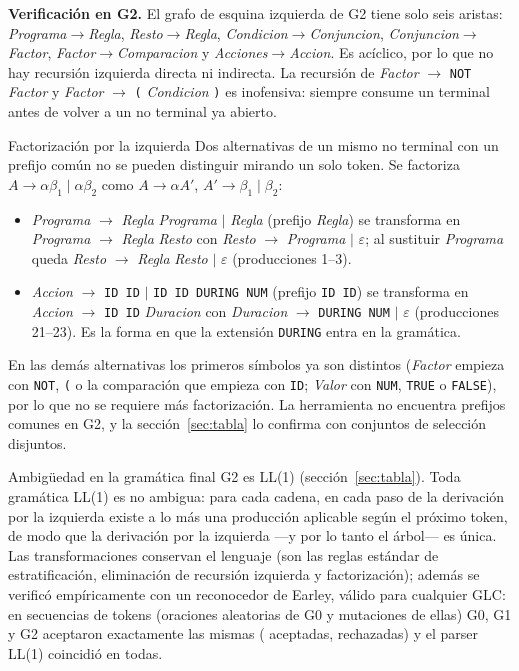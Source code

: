 \documentclass[11pt,letterpaper]{article}
\makeatletter
\renewcommand\subsection{\@startsection{subsection}{2}{\z@}{-2.6ex\@plus -1ex \@minus -.2ex}{1.0ex \@plus .2ex}%
  {\normalfont\large\bfseries}}
\newcommand{\T}[1]{\texttt{#1}}
\newcommand{\NT}[1]{\textit{#1}}
\newcommand{\eps}{\ensuremath{\varepsilon}}
\makeatother
\begin{document}
\textbf{Verificación en G2.} El grafo de esquina izquierda de G2 tiene solo seis aristas:
\NT{Programa}$\to$\NT{Regla}, \NT{Resto}$\to$\NT{Regla}, \NT{Condicion}$\to$\NT{Conjuncion},
\NT{Conjuncion}$\to$\NT{Factor}, \NT{Factor}$\to$\NT{Comparacion} y \NT{Acciones}$\to$\NT{Accion}. Es
acíclico, por lo que no hay recursión izquierda directa ni indirecta. La recursión de \NT{Factor} $\to$ \T{NOT}
\NT{Factor} y \NT{Factor} $\to$ \T{(} \NT{Condicion} \T{)} es inofensiva: siempre consume un terminal antes de
volver a un no terminal ya abierto.

\subsection{Factorización por la izquierda}
Dos alternativas de un mismo no terminal con un prefijo común no se pueden distinguir mirando un solo token.
Se factoriza $A \to \alpha\beta_1 \mid \alpha\beta_2$ como $A \to \alpha A'$, $A' \to \beta_1 \mid \beta_2$:
\begin{itemize}
\item \NT{Programa} $\to$ \NT{Regla} \NT{Programa} $\mid$ \NT{Regla} (prefijo \NT{Regla}) se transforma en
\NT{Programa} $\to$ \NT{Regla} \NT{Resto} con \NT{Resto} $\to$ \NT{Programa} $\mid$ \eps; al sustituir
\NT{Programa} queda \NT{Resto} $\to$ \NT{Regla} \NT{Resto} $\mid$ \eps{} (producciones 1--3).
\item \NT{Accion} $\to$ \T{ID ID} $\mid$ \T{ID ID DURING NUM} (prefijo \T{ID ID}) se transforma en
\NT{Accion} $\to$ \T{ID ID} \NT{Duracion} con \NT{Duracion} $\to$ \T{DURING NUM} $\mid$ \eps{}
(producciones 21--23). Es la forma en que la extensión \T{DURING} entra en la gramática.
\end{itemize}
En las demás alternativas los primeros símbolos ya son distintos (\NT{Factor} empieza con \T{NOT}, \T{(} o la
comparación que empieza con \T{ID}; \NT{Valor} con \T{NUM}, \T{TRUE} o \T{FALSE}), por lo que no se requiere más
factorización. La herramienta no encuentra prefijos comunes en G2, y la sección~\ref{sec:tabla} lo confirma
con conjuntos de selección disjuntos.

\subsection{Ambigüedad en la gramática final}
G2 es LL(1) (sección~\ref{sec:tabla}). Toda gramática LL(1) es no ambigua: para cada cadena, en cada paso de
la derivación por la izquierda existe a lo más una producción aplicable según el próximo token, de modo que la
derivación por la izquierda ---y por lo tanto el árbol--- es única. Las transformaciones conservan el lenguaje
(son las reglas estándar de estratificación, eliminación de recursión izquierda y factorización); además se
verificó empíricamente con un reconocedor de Earley, válido para cualquier GLC: en \NumDiferenciales{} secuencias
de tokens (oraciones aleatorias de G0 y mutaciones de ellas) G0, G1 y G2 aceptaron exactamente las mismas
(\NumEarleyAceptadas{} aceptadas, \NumDiferencialesRechazadas{} rechazadas) y el parser LL(1) coincidió en
todas.
\end{document}
